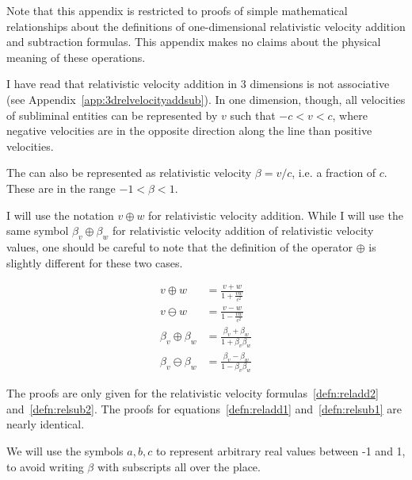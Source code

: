 \documentclass[a4paper]{article}
\theoremstyle{plain}
\theoremstyle{definition}
\begin{document}
Note that this appendix is restricted to proofs of simple mathematical
relationships about the definitions of one-dimensional relativistic
velocity addition and subtraction formulas.  This appendix makes no
claims about the physical meaning of these operations.

I have read that relativistic velocity addition in 3 dimensions is not
associative (see Appendix~\ref{app:3drelvelocityaddsub}).
In one dimension, though, all velocities of subliminal entities can be
represented by $v$ such that $-c < v < c$, where negative velocities
are in the opposite direction along the line than positive velocities.

The can also be represented as relativistic velocity $\beta = v/c$,
i.e. a fraction of $c$.  These are in the range $-1 < \beta < 1$.

I will use the notation $v \oplus w$ for relativistic velocity
addition.  While I will use the same symbol $\beta_v \oplus \beta_w$
for relativistic velocity addition of relativistic velocity values,
one should be careful to note that the definition of the operator
$\oplus$ is slightly different for these two cases.

\begin{align}
v \oplus w & = \frac{v+w}{1+\frac{vw}{c^2}} \label{defn:reladd1} \\
v \ominus w & = \frac{v-w}{1-\frac{vw}{c^2}} \label{defn:relsub1} \\
\beta_v \oplus \beta_w & = \frac{\beta_v+\beta_w}{1+\beta_v \beta_w} \label{defn:reladd2} \\
\beta_v \ominus \beta_w & = \frac{\beta_v-\beta_w}{1- \beta_v \beta_w} \label{defn:relsub2}
\end{align}

The proofs are only given for the relativistic velocity
formulas~\eqref{defn:reladd2} and~\eqref{defn:relsub2}.  The proofs
for equations~\eqref{defn:reladd1}
and~\eqref{defn:relsub1} are nearly identical.

We will use the symbols $a, b, c$ to represent arbitrary real values
between -1 and 1, to avoid writing $\beta$ with subscripts all over
the place.
\end{document}

